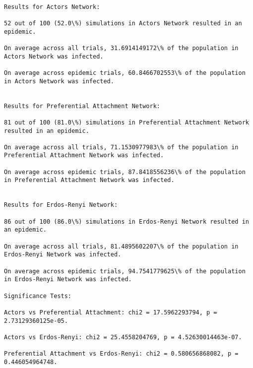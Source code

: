 \documentclass[11pt]{article}
\begin{document}
    \begin{Verbatim}[commandchars=\\\{\}]

Results for Actors Network:

52 out of 100 (52.0\%) simulations in Actors Network resulted in an epidemic.

On average across all trials, 31.6914149172\% of the population in Actors Network was infected.

On average across epidemic trials, 60.8466702553\% of the population in Actors Network was infected.


Results for Preferential Attachment Network:

81 out of 100 (81.0\%) simulations in Preferential Attachment Network resulted in an epidemic.

On average across all trials, 71.1530977983\% of the population in Preferential Attachment Network was infected.

On average across epidemic trials, 87.8418556236\% of the population in Preferential Attachment Network was infected.


Results for Erdos-Renyi Network:

86 out of 100 (86.0\%) simulations in Erdos-Renyi Network resulted in an epidemic.

On average across all trials, 81.4895602207\% of the population in Erdos-Renyi Network was infected.

On average across epidemic trials, 94.7541779625\% of the population in Erdos-Renyi Network was infected.

Significance Tests:

Actors vs Preferential Attachment: chi2 = 17.5962293794, p = 2.73129360125e-05.

Actors vs Erdos-Renyi: chi2 = 25.4558204769, p = 4.52630014463e-07.

Preferential Attachment vs Erdos-Renyi: chi2 = 0.580656868082, p = 0.446054964748.


    \end{Verbatim}
\end{document}
